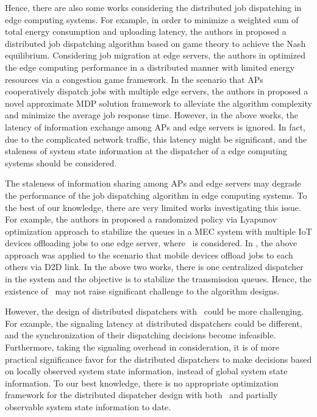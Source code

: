 Hence, there are also some works considering the distributed job dispatching in edge computing systems.
For example, in order to minimize a weighted sum of total energy consumption and uploading latency, the authors in \cite{ToN-Xuchen2016} proposed a distributed job dispatching algorithm based on game theory to achieve the Nash equilibrium. 
Considering job migration at edge servers, the authors in \cite{ToN-xujie2018} optimized the edge computing performance in a distributed manner with limited energy resources via a congestion game framework.
In the scenario that APs cooperatively dispatch jobs with multiple edge servers, the authors in \cite{mdp-jcin} proposed a novel approximate MDP solution framework to alleviate the algorithm complexity and minimize the average job response time.
However, in the above works, the latency of information exchange among APs and edge servers is ignored.
In fact, due to the complicated network traffic, this latency might be significant, and the staleness of system state information at the dispatcher of a edge computing systems should be considered.

The staleness of information sharing among APs and edge servers may degrade the performance of the job dispatching algorithm in edge computing systems.
To the best of our knowledge, there are very limited works investigating this issue.
For example, the authors in \cite{JSAC17-LyuX} proposed a randomized policy via Lyapunov optimization approach to stabilize the queues in a MEC system with multiple IoT devices offloading jobs to one edge server, where \brlatency~is considered. 
In \cite{TWC18-LyuX}, the above approach was applied to the scenario that mobile devices offload jobs to each others via D2D link.
In the above two works, there is one centralized dispatcher in the system and the objective is to stabilize the transmission queues.
Hence, the existence of \brlatency~may not raise significant challenge to the algorithm designs.

However, the design of distributed dispatchers with \brlatency~could be more challenging.
For example, the signaling latency at distributed dispatchers could be different, and the synchronization of their dispatching decisions become infeasible.
Furthermore, taking the signaling overhead in consideration, it is of more practical significance favor for the distributed dispatchers to make decisions based on locally observed system state information, instead of global system state information.
To our best knowledge, there is no appropriate optimization framework for the distributed dispatcher design with both \brlatency~and partially observable system state information to date.

